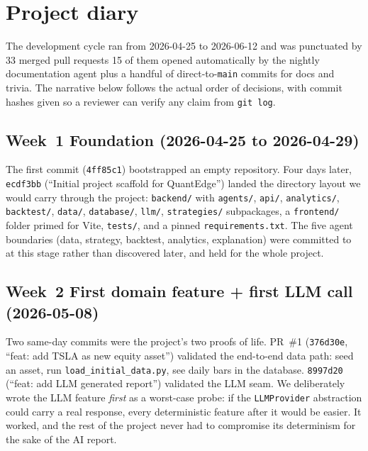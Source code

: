 \section{Project diary}
\label{sec:diary}

The development cycle ran from 2026-04-25 to 2026-06-12 and was punctuated by 33
merged pull requests \textemdash{} 15 of them opened automatically by the nightly
documentation agent \textemdash{} plus a handful of direct-to-\texttt{main} commits
for docs and trivia. The narrative below follows the actual order of decisions,
with commit hashes given so a reviewer can verify any claim from \texttt{git log}.

\subsection*{Week~1 \textemdash{} Foundation (2026-04-25 to 2026-04-29)}

The first commit (\texttt{4ff85c1}) bootstrapped an empty repository. Four days
later, \texttt{ecdf3bb} (``Initial project scaffold for QuantEdge'') landed the
directory layout we would carry through the project: \texttt{backend/} with
\texttt{agents/}, \texttt{api/}, \texttt{analytics/}, \texttt{backtest/},
\texttt{data/}, \texttt{database/}, \texttt{llm/}, \texttt{strategies/}
subpackages, a \texttt{frontend/} folder primed for Vite, \texttt{tests/}, and a
pinned \texttt{requirements.txt}. The five agent boundaries (data, strategy,
backtest, analytics, explanation) were committed to at this stage
rather than discovered later, and held for the whole project.

\subsection*{Week~2 \textemdash{} First domain feature + first LLM call (2026-05-08)}

Two same-day commits were the project's two proofs of life. PR~\#1
(\texttt{376d30e}, ``feat: add TSLA as new equity asset'') validated the
end-to-end data path: seed an asset, run \texttt{load\_initial\_data.py}, see
daily bars in the database. \texttt{8997d20} (``feat: add LLM generated
report'') validated the LLM seam. We deliberately wrote the LLM feature
\emph{first} as a worst-case probe: if the \texttt{LLMProvider} abstraction could
carry a real response, every deterministic feature after it would be easier. It
worked, and the rest of the project never had to compromise its determinism for
the sake of the AI report.

